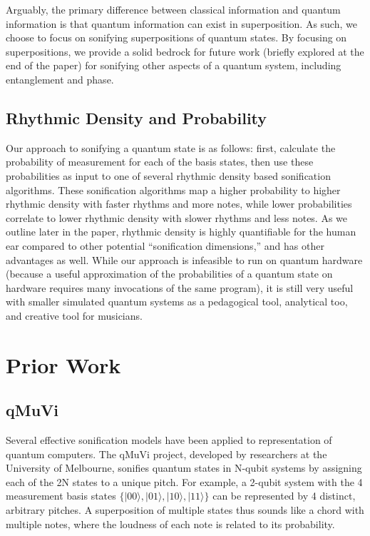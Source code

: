 \documentclass[10pt,twocolumn]{article}
\begin{document}
Arguably, the primary difference between classical information and quantum information is that quantum information can exist in superposition. As such, we choose to focus on sonifying superpositions of quantum states. By focusing on superpositions, we provide a solid bedrock for future work (briefly explored at the end of the paper) for sonifying other aspects of a quantum system, including entanglement and phase.

\subsection{Rhythmic Density and Probability}

Our approach to sonifying a quantum state is as follows: first, calculate the probability of measurement for each of the basis states, then use these probabilities as input to one of several rhythmic density based sonification algorithms. These sonification algorithms map a higher probability to higher rhythmic density with faster rhythms and more notes, while lower probabilities correlate to lower rhythmic density with slower rhythms and less notes. As we outline later in the paper, rhythmic density is highly quantifiable for the human ear compared to other potential “sonification dimensions,” and has other advantages as well. While our approach is infeasible to run on quantum hardware (because a useful approximation of the probabilities of a quantum state on hardware requires many invocations of the same program), it is still very useful with smaller simulated quantum systems as a pedagogical tool, analytical too, and creative tool for musicians.

\section{Prior Work}

\subsection{qMuVi}

Several effective sonification models have been applied to representation of quantum computers. The qMuVi\cite{qmuvi} project, developed by researchers at the University of Melbourne, sonifies quantum states in N-qubit systems by assigning each of the 2N states to a unique pitch. For example, a 2-qubit system with the 4 measurement basis states $\{|00\rangle, |01\rangle, |10\rangle, |11\rangle\}$ can be represented by 4 distinct, arbitrary pitches. A superposition of multiple states thus sounds like a chord with multiple notes, where the loudness of each note is related to its probability.
\end{document}

